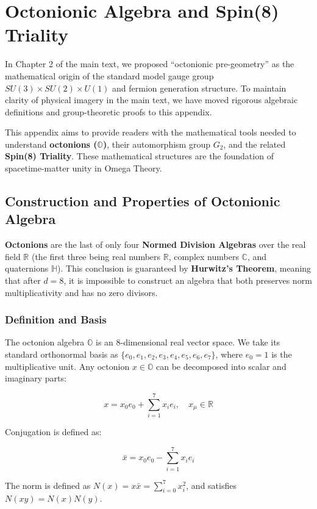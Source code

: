 \section{Octonionic Algebra and Spin(8) Triality}

In Chapter 2 of the main text, we proposed ``octonionic pre-geometry'' as the mathematical origin of the standard model gauge group $SU(3) \times SU(2) \times U(1)$ and fermion generation structure. To maintain clarity of physical imagery in the main text, we have moved rigorous algebraic definitions and group-theoretic proofs to this appendix.

This appendix aims to provide readers with the mathematical tools needed to understand \textbf{octonions ($\mathbb{O}$)}, their automorphism group $G_2$, and the related \textbf{Spin(8) Triality}. These mathematical structures are the foundation of spacetime-matter unity in Omega Theory.

\subsection{Construction and Properties of Octonionic Algebra}

\textbf{Octonions} are the last of only four \textbf{Normed Division Algebras} over the real field $\mathbb{R}$ (the first three being real numbers $\mathbb{R}$, complex numbers $\mathbb{C}$, and quaternions $\mathbb{H}$). This conclusion is guaranteed by \textbf{Hurwitz's Theorem}, meaning that after $d=8$, it is impossible to construct an algebra that both preserves norm multiplicativity and has no zero divisors.

\subsubsection{Definition and Basis}

The octonion algebra $\mathbb{O}$ is an 8-dimensional real vector space. We take its standard orthonormal basis as $\{e_0, e_1, e_2, e_3, e_4, e_5, e_6, e_7\}$, where $e_0 = 1$ is the multiplicative unit.
Any octonion $x \in \mathbb{O}$ can be decomposed into scalar and imaginary parts:

\[x = x_0 e_0 + \sum_{i=1}^7 x_i e_i, \quad x_\mu \in \mathbb{R}\]

Conjugation is defined as:

\[\bar{x} = x_0 e_0 - \sum_{i=1}^7 x_i e_i\]

The norm is defined as $N(x) = x\bar{x} = \sum_{i=0}^7 x_i^2$, and satisfies $N(xy) = N(x)N(y)$.

